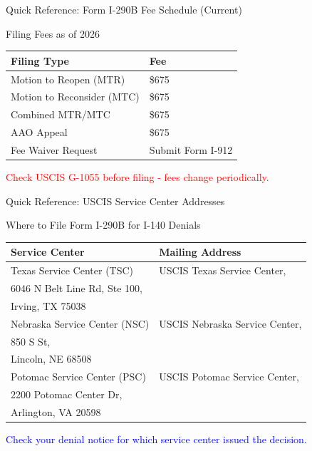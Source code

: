 \documentclass[11pt]{beamer}
\begin{document}
	
	\begin{frame}{Quick Reference: Form I-290B Fee Schedule (Current)}
		\scriptsize
		\begin{block}{Filing Fees as of 2026}
			\centering
			\begin{tabular}{|p{5cm}|p{3cm}|}
				\hline
				\textbf{Filing Type} & \textbf{Fee} \\
				\hline
				Motion to Reopen (MTR) & \$675 \\
				\hline
				Motion to Reconsider (MTC) & \$675 \\
				\hline
				Combined MTR/MTC & \$675 \\
				\hline
				AAO Appeal & \$675 \\
				\hline
				Fee Waiver Request & Submit Form I-912 \\
				\hline
			\end{tabular}
			\vspace{0.2cm}
			\textcolor{red}{Check USCIS G-1055 before filing - fees change periodically.}
		\end{block}
	\end{frame}
	
	\begin{frame}{Quick Reference: USCIS Service Center Addresses}
		\scriptsize
		\begin{block}{Where to File Form I-290B for I-140 Denials}
			\centering
			\begin{tabular}{|p{4cm}|p{5cm}|}
				\hline
				\textbf{Service Center} & \textbf{Mailing Address} \\
				\hline
				Texas Service Center (TSC) & USCIS Texas Service Center,\\ 6046 N Belt Line Rd, Ste 100,\\ Irving, TX 75038 \\
				\hline
				Nebraska Service Center (NSC) & USCIS Nebraska Service Center,\\ 850 S St,\\ Lincoln, NE 68508 \\
				\hline
				Potomac Service Center (PSC) & USCIS Potomac Service Center,\\ 2200 Potomac Center Dr,\\ Arlington, VA 20598 \\
				\hline
			\end{tabular}
			\vspace{0.2cm}
			\textcolor{blue}{Check your denial notice for which service center issued the decision.}
		\end{block}
	\end{frame}
	
\end{document}
